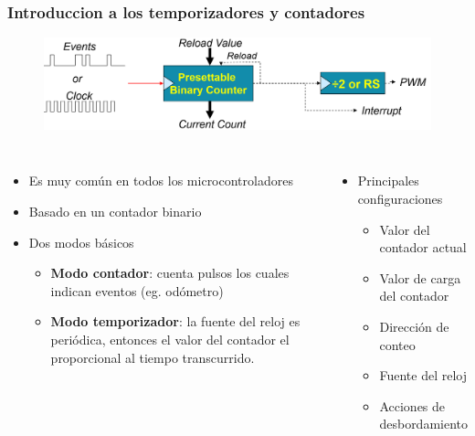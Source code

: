 \documentclass[10.5pt,scale=1.0,t,aspectratio=169,hyperref={pdfpagelabels=false}]{beamer}
\begin{document}
\begin{frame}
	\frametitle{Introduccion a los temporizadores y contadores }
	{\small
	\begin{figure}
		\centering
		\includegraphics[scale=0.3]{01_GenericTimer}
	\end{figure}	
	\begin{columns}
		\begin{itemize}
			 \setlength\itemsep{0em}
			\item Es muy común en todos los microcontroladores
			\item Basado en un contador binario
			\item Dos modos básicos
			\begin{itemize}
				\item \textbf{Modo contador}: cuenta pulsos los cuales indican eventos (eg. odómetro)
				\item \textbf{Modo temporizador}: la fuente del reloj es periódica, entonces el valor del contador el proporcional al tiempo transcurrido.
			\end{itemize}
		\end{itemize}
	
		\begin{itemize}
			\item Principales configuraciones
			\begin{itemize}
				\item Valor del contador actual
				\item Valor de carga del contador
				\item Dirección de conteo
				\item Fuente del reloj
				\item Acciones de desbordamiento
			\end{itemize}
		\end{itemize}
	\end{columns}
	}
\end{frame}
\end{document}
